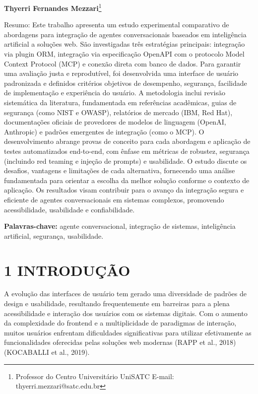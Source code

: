 \documentclass[
]{article}
\begin{document}
\textbf{Thyerri Fernandes Mezzari}\footnote{Professor do Centro
  Universitário UniSATC E-mail: thyerri.mezzari@satc.edu.br}

Resumo: Este trabalho apresenta um estudo experimental comparativo de
abordagens para integração de agentes conversacionais baseados em
inteligência artificial a soluções web. São investigadas três
estratégias principais: integração via plugin ORM, integração via
especificação OpenAPI com o protocolo Model Context Protocol (MCP) e
conexão direta com banco de dados. Para garantir uma avaliação justa e
reprodutível, foi desenvolvida uma interface de usuário padronizada e
definidos critérios objetivos de desempenho, segurança, facilidade de
implementação e experiência do usuário. A metodologia inclui revisão
sistemática da literatura, fundamentada em referências acadêmicas, guias
de segurança (como NIST e OWASP), relatórios de mercado (IBM, Red Hat),
documentações oficiais de provedores de modelos de linguagem (OpenAI,
Anthropic) e padrões emergentes de integração (como o MCP). O
desenvolvimento abrange provas de conceito para cada abordagem e
aplicação de testes automatizados end-to-end, com ênfase em métricas de
robustez, segurança (incluindo red teaming e injeção de prompts) e
usabilidade. O estudo discute os desafios, vantagens e limitações de
cada alternativa, fornecendo uma análise fundamentada para orientar a
escolha da melhor solução conforme o contexto de aplicação. Os
resultados visam contribuir para o avanço da integração segura e
eficiente de agentes conversacionais em sistemas complexos, promovendo
acessibilidade, usabilidade e confiabilidade.

\textbf{Palavras-chave:} agente conversacional, integração de sistemas,
inteligência artificial, segurança, usabilidade.

\section{1 INTRODUÇÃO}\label{introduuxe7uxe3o}

A evolução das interfaces de usuário tem gerado uma diversidade de
padrões de design e usabilidade, resultando frequentemente em barreiras
para a plena acessibilidade e interação dos usuários com os sistemas
digitais. Com o aumento da complexidade do frontend e a multiplicidade
de paradigmas de interação, muitos usuários enfrentam dificuldades
significativas para utilizar efetivamente as funcionalidades oferecidas
pelas soluções web modernas (RAPP et al., 2018) (KOCABALLI et al.,
2019).
\end{document}
